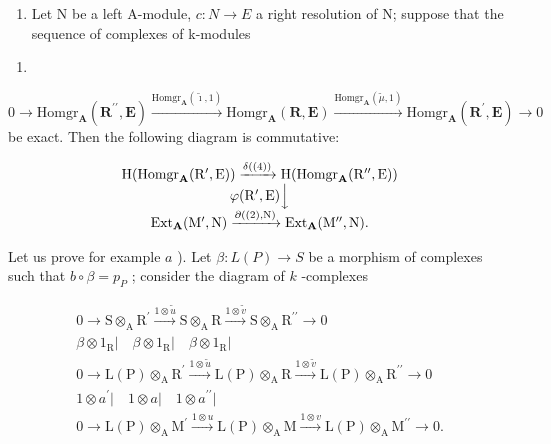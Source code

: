 \begin{enumerate}
\def\labelenumi{\alph{enumi})}
\setcounter{enumi}{1}
\tightlist
\item
  Let N be a left A-module, \(c : N \to E\) a right resolution of N; suppose that the sequence of complexes of k-modules
\end{enumerate}

\begin{enumerate}
\def\labelenumi{(\arabic{enumi})}
\setcounter{enumi}{3}
\tightlist
\item
\end{enumerate}

\(0 \to \text{Homgr}_{\mathbf{A}}(\mathbf{R}^{\prime \prime}, \mathbf{E}) \xrightarrow{\text{Homgr}_{\mathbf{A}}(\tilde{\imath}, 1)} \text{Homgr}_{\mathbf{A}}(\mathbf{R}, \mathbf{E}) \xrightarrow{\text{Homgr}_{\mathbf{A}}(\tilde{\mu}, 1)} \text{Homgr}_{\mathbf{A}}(\mathbf{R}^{\prime}, \mathbf{E}) \to 0\) be exact. Then the following diagram is commutative:

\[
\begin{array}{c} \mathrm{H} (\operatorname{Homgr} _ {\mathbf {A}} (\mathrm{R} ^ {\prime}, \mathrm{E})) \xrightarrow {\delta ((4))} \mathrm{H} (\operatorname{Homgr} _ {\mathbf {A}} (\mathrm{R} ^ {\prime \prime}, \mathrm{E})) \\ \varphi (\mathrm{R} ^ {\prime}, \mathrm{E}) \Big \downarrow \\ \operatorname{Ext} _ {\mathbf {A}} (\mathrm{M} ^ {\prime}, \mathrm{N}) \xrightarrow {\partial ((2) , \mathrm{N})} \operatorname{Ext} _ {\mathbf {A}} (\mathrm{M} ^ {\prime \prime}, \mathrm{N}). \end{array}
\]

Let us prove for example \(a\) ). Let \(\beta: L(P) \to S\) be a morphism of complexes such that \(b \circ \beta = p_{P}\) ; consider the diagram of \(k\) -complexes

\[
\begin{array}{c}0 \rightarrow \mathrm{S} \otimes_ {\mathrm{A}} \mathrm{R} ^ {\prime} \xrightarrow {1 \otimes \tilde {u}} \mathrm{S} \otimes_ {\mathrm{A}} \mathrm{R} \xrightarrow {1 \otimes \tilde {v}} \mathrm{S} \otimes_ {\mathrm{A}} \mathrm{R} ^ {\prime \prime} \longrightarrow 0\\\beta \otimes 1 _ {\mathrm{R}} \Bigg | \quad \beta \otimes 1 _ {\mathrm{R}} \Bigg | \quad \beta \otimes 1 _ {\mathrm{R}} \Bigg |\\0 \rightarrow \mathrm{L(P)} \otimes_ {\mathrm{A}} \mathrm{R} ^ {\prime} \xrightarrow {1 \otimes \tilde {u}} \mathrm{L(P)} \otimes_ {\mathrm{A}} \mathrm{R} \xrightarrow {1 \otimes \tilde {v}} \mathrm{L(P)} \otimes_ {\mathrm{A}} \mathrm{R} ^ {\prime \prime} \longrightarrow 0\\1 \otimes a ^ {\prime} \Bigg | \quad 1 \otimes a \Bigg | \quad 1 \otimes a ^ {\prime \prime} \Bigg |\\0 \rightarrow \mathrm{L(P)} \otimes_ {\mathrm{A}} \mathrm{M} ^ {\prime} \xrightarrow {1 \otimes u} \mathrm{L(P)} \otimes_ {\mathrm{A}} \mathrm{M} \xrightarrow {1 \otimes v} \mathrm{L(P)} \otimes_ {\mathrm{A}} \mathrm{M} ^ {\prime \prime} \longrightarrow 0.\end{array}
\]

